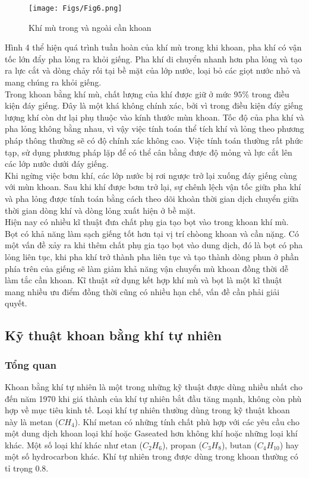 \documentclass[12pt,a4paper]{article}
\begin{document}
	\begin{figure}[h]
	\centering
	\texttt{[image: Figs/Fig6.png]}
	\caption{Khí mù trong và ngoài cần khoan\cite{rehm2013underbalanced}}
	\end{figure}
	Hình 4 thể hiện quá trình tuần hoàn của khí mù trong khi khoan, pha khí có vận tốc lớn đẩy pha lỏng ra khỏi giếng. Pha khí di chuyển nhanh hơn pha lỏng và tạo ra lực cắt và dòng chảy rối tại bề mặt của lớp nước, loại bỏ các giọt nước nhỏ và mang chúng ra khỏi giếng.\\
	Trong khoan bằng khí mù, chất lượng của khí được giữ ở mức $95\%$ trong điều kiện đáy giếng. Đây là một khá không chính xác, bởi vì trong điều kiện đáy giếng lượng khí còn dư lại phụ thuộc vào kính thước mùn khoan. Tốc độ của pha khí và pha lỏng không bằng nhau, vì vậy việc tính toán thể tích khí và lỏng theo phương pháp thông thường sẽ có độ chính xác không cao. Việc tính toán thường rất phức tạp, sử dụng phương pháp lặp để có thể cân bằng được độ mỏng và lực cắt lên các lớp nước dưới đáy giếng.\\
	Khi ngừng việc bơm khí, các lớp nước bị rơi ngược trở lại xuống đáy giếng cùng với mùn khoan. Sau khi khí được bơm trở lại, sự chênh lệch vận tốc giữa pha khí và pha lỏng được tính toán bằng cách theo dõi khoàn thời gian dịch chuyển giữa thời gian dòng khí và dòng lỏng xuất hiện ở bề mặt.\\
	Hiện nay có nhiều kĩ thuật đưa chất phụ gia tạo bọt vào trong khoan khí mù. Bọt có khả năng làm sạch giếng tốt hơn tại vị trí chòong khoan và cần nặng. Có một vấn đề xảy ra khi thêm chất phụ gia tạo bọt vào dung dịch, đó là bọt có pha lỏng liên tục, khi pha khí trở thành pha liên tục và tạo thành dòng phun ở phần phía trên của giếng sẽ làm giảm khả năng vận chuyển mù khoan đồng thời dễ làm tắc cần khoan. Kĩ thuật sử dụng kết hợp khí mù và bọt là một kĩ thuật mang nhiều ưu điểm đồng thời cũng có nhiều hạn chế, vấn đề cần phải giải quyết.
\subsection{Kỹ thuật khoan bằng khí tự nhiên}
\subsubsection{Tổng quan}
	Khoan bằng khí tự nhiên\cite{rehm2013underbalanced} là một trong những kỹ thuật được dùng nhiều nhất cho đến năm 1970 khi giá thành của khí tự nhiên bắt đầu tăng mạnh, không còn phù hợp về mục tiêu kinh tế. Loại khí tự nhiên thường dùng trong kỹ thuật khoan này là metan ($CH_4$). Khí metan có những tính chất phù hợp với các yêu cầu cho một dung dịch khoan loại khí hoặc Gaseated hơn không khí hoặc những loại khí khác. Một số loại khí khác như etan ($C_2H_6$), propan ($C_3H_8$), butan ($C_4H_{10}$) hay một số hydrocarbon khác. Khí tự nhiên trong được dùng trong khoan thường có tỉ trọng 0.8.
\end{document}
